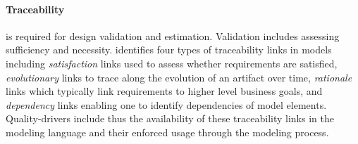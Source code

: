 \paragraph{Traceability} is required for design validation and estimation. Validation includes assessing sufficiency and necessity. \cite{ramesh_toward_2001} identifies four types of traceability links in models including \emph{satisfaction} links used to assess whether requirements are satisfied, \emph{evolutionary} links to trace along the evolution of an artifact over time, \emph{rationale} links which typically link requirements to higher level business goals, and \emph{dependency} links enabling one to identify dependencies of model elements. Quality-drivers include thus the availability of these traceability links in the modeling language and their enforced usage through the modeling process.